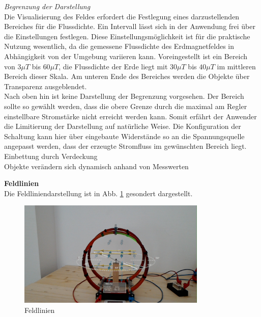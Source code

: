 \textit{Begrenzung der Darstellung}\\
Die Visualisierung des Feldes erfordert die Festlegung eines darzustellenden Bereiches für die Flussdichte. Ein Intervall lässt sich in der Anwendung frei über die Einstellungen festlegen. Diese Einstellungsmöglichkeit ist für die praktische Nutzung wesentlich, da die gemessene Flussdichte des Erdmagnetfeldes in Abhängigkeit von der Umgebung variieren kann. Voreingestellt ist ein Bereich von $3\mu T$ bis $60\mu T$, die Flussdichte der Erde liegt mit $30 \mu T$ bis $40 \mu T$ im mittleren Bereich dieser Skala. Am unteren Ende des Bereiches werden die Objekte über Transparenz ausgeblendet.\\

Nach oben hin ist keine Darstellung der Begrenzung vorgesehen. Der Bereich sollte so gewählt werden, dass die obere Grenze durch die maximal am Regler einstellbare Stromstärke nicht erreicht werden kann. Somit erfährt der Anwender die Limitierung der Darstellung auf natürliche Weise. Die Konfiguration der Schaltung kann hier über eingebaute Widerstände so an die Spannungsquelle angepasst werden, dass der erzeugte Stromfluss im gewünschten Bereich liegt.\\

Einbettung durch Verdeckung\\
Objekte verändern sich dynamisch anhand von Messwerten

\textbf{Feldlinien}\\
Die Feldliniendarstellung ist in Abb. \ref{img:mfield-lines} gesondert dargestellt.
\begin{figure}[H]
	\centering
	\includegraphics[width=0.8\textwidth]{images/HL/fieldlines.jpg}
	\caption{Feldlinien}
	\label{img:mfield-lines}
\end{figure}

